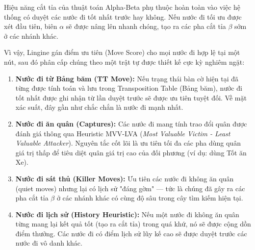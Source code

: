 Hiệu năng cắt tỉa của thuật toán Alpha-Beta phụ thuộc hoàn toàn vào việc hệ thống có duyệt các nước đi tốt nhất trước hay không. Nếu nước đi tối ưu được xét đầu tiên, biên $\alpha$ sẽ được nâng lên nhanh chóng, tạo ra các pha cắt tỉa $\beta$ sớm ở các nhánh khác.

Vì vậy, Lingine gán điểm ưu tiên (Move Score) cho mọi nước đi hợp lệ tại một nút, sau đó phân cấp chúng theo một trật tự được thiết kế cực kỳ nghiêm ngặt:

\begin{enumerate}
    \item \textbf{Nước đi từ Bảng băm (TT Move):} Nếu trạng thái bàn cờ hiện tại đã từng được tính toán và lưu trong Transposition Table (Bảng băm), nước đi tốt nhất được ghi nhận từ lần duyệt trước sẽ được ưu tiên tuyệt đối. Về mặt xác suất, đây gần như chắc chắn là nước đi mạnh nhất.
    
    \item \textbf{Nước đi ăn quân (Captures):} Các nước đi mang tính trao đổi quân được đánh giá thông qua Heuristic MVV-LVA (\textit{Most Valuable Victim - Least Valuable Attacker}). Nguyên tắc cốt lõi là ưu tiên tối đa các pha dùng quân giá trị thấp để tiêu diệt quân giá trị cao của đối phương (ví dụ: dùng Tốt ăn Xe).
    
    \item \textbf{Nước đi sát thủ (Killer Moves):} Ưu tiên các nước đi không ăn quân (quiet moves) nhưng lại có lịch sử "đáng gờm" — tức là chúng đã gây ra các pha cắt tỉa $\beta$ ở các nhánh khác có cùng độ sâu trong cây tìm kiếm hiện tại.
    
    \item \textbf{Nước đi lịch sử (History Heuristic):} Nếu một nước đi không ăn quân từng mang lại kết quả tốt (tạo ra cắt tỉa) trong quá khứ, nó sẽ được cộng dồn điểm thưởng. Các nước đi có điểm lịch sử lũy kế cao sẽ được duyệt trước các nước đi vô danh khác.
\end{enumerate}


